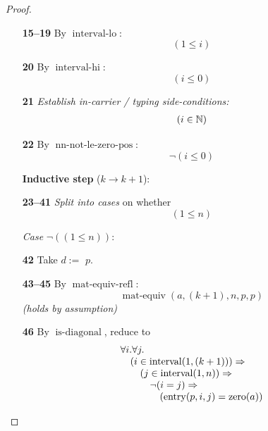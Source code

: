 \documentclass[11pt]{article}
\theoremstyle{plain}
\begin{document}
\begin{proof}
\begin{itemize}[leftmargin=2.8em, itemsep=4pt, parsep=1pt]
  \item[\textbf{15--19}] By $\operatorname{interval\text{-}lo}$:
\begin{equation*}
(1 \leq i)
\end{equation*}

  \item[\textbf{20}] By $\operatorname{interval\text{-}hi}$:
\begin{equation*}
(i \leq 0)
\end{equation*}

  \item[\textbf{21}] \emph{Establish in-carrier / typing side-conditions:}
\begin{equation*}
\begin{array}{@{}l@{}}
(i \in \mathbb{N})
\end{array}
\end{equation*}

  \item[\textbf{22}] By $\operatorname{nn\text{-}not\text{-}le\text{-}zero\text{-}pos}$:
\begin{equation*}
\neg (i \leq 0)
\end{equation*}

  \item[]\textbf{Inductive step} ($k \to k + 1$):
  \item[\textbf{23--41}] \emph{Split into cases} on whether
\begin{equation*}
(1 \leq n)
\end{equation*}

  \item[]\emph{Case} $\lnot((1 \leq n))$:
  \item[\textbf{42}] Take $d :=$ $p$.
  \item[\textbf{43--45}] By $\operatorname{mat\text{-}equiv\text{-}refl}$:
\begin{equation*}
\operatorname{mat\text{-}equiv}(a, (k + 1), n, p, p)
\end{equation*}
  \emph{(holds by assumption)}
  \item[\textbf{46}] By $\operatorname{is\text{-}diagonal}$, reduce to
\begin{equation*}
\begin{array}{@{}l@{}} \forall i. \forall j. \\ \quad (i \in \operatorname{interval}(1, (k + 1))) \Rightarrow  \\ \quad \quad (j \in \operatorname{interval}(1, n)) \Rightarrow  \\ \quad \quad \quad \neg (i = j) \Rightarrow  \\ \quad \quad \quad \quad (\operatorname{entry}(p, i, j) = \operatorname{zero}(a)) \end{array}
\end{equation*}


\end{itemize}
\end{proof}
\end{document}
